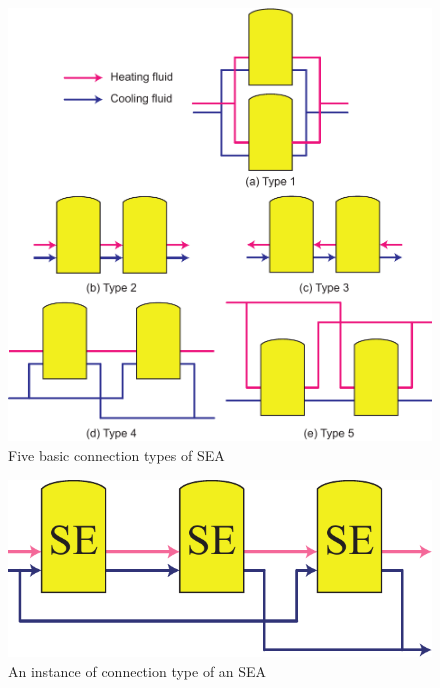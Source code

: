 \noindent \begin{figure}[htbp]
\begin{center}
	\includegraphics[width = 0.7\columnwidth]{fig/BasicSEA}
	\caption{Five basic connection types of SEA}
	\label{fig:SEA}
\end{center}
\end{figure}

\noindent \begin{figure}[htbp]
\begin{center}
	\includegraphics[width = 0.7\columnwidth]{fig/SEA_eg}
	\caption{An instance of connection type of an SEA}
	\label{fig:SEA_eg}
\end{center}
\end{figure}

